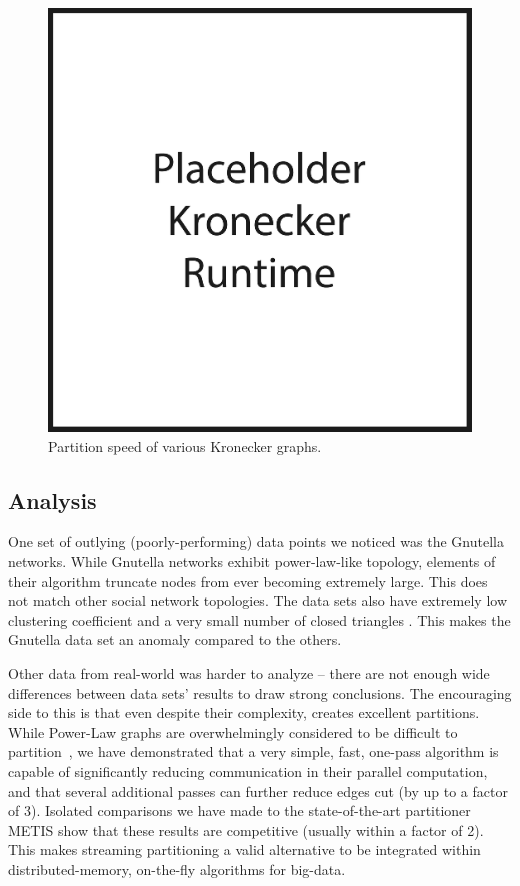 \begin{figure}[h!]
\centering
  \includegraphics[width=0.8\columnwidth]{figures/kronecker_speed_tests.pdf}
  \caption{Partition speed of various Kronecker graphs.}
  \label{fig:kronspeed}
\end{figure}


\subsection{Analysis}

One set of outlying (poorly-performing) data points we noticed was the Gnutella networks.
While Gnutella networks exhibit power-law-like topology, elements of their algorithm truncate nodes from ever becoming extremely large. 
This does not match other social network topologies.
The data sets also have extremely low clustering coefficient and a very small number of closed triangles \cite{Ripeanu:2002:MGN:613352.613670}. 
This makes the Gnutella data set an anomaly compared to the others.

Other data from real-world was harder to analyze -- there are not enough wide differences between data sets' results to draw strong conclusions.
The encouraging side to this is that even despite their complexity, \ourmethod creates excellent partitions.
While Power-Law graphs are overwhelmingly considered to be difficult to partition~\cite{Abou-Rjeili:2006:MAP:1898953.1899055}, we have demonstrated that a very simple, fast, one-pass algorithm is capable of significantly reducing communication in their parallel computation, and that several additional passes can further reduce edges cut (by up to a factor of 3). Isolated comparisons we have made to the state-of-the-art partitioner METIS show that these results are competitive (usually within a factor of 2).
This makes streaming partitioning a valid alternative to be integrated within distributed-memory, on-the-fly algorithms for big-data.

